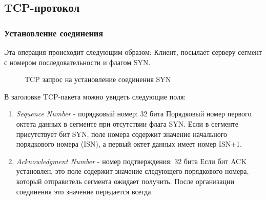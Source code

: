 \documentclass[a4paper, 14pt,russian]{article}
\begin{document}
\newpage

\subsection{TCP-протокол}
	\subsubsection{Установление соединения}
		Эта операция происходит следующим образом: 
		Клиент, посылает серверу сегмент с номером последовательности и флагом SYN.
		\begin{figure}[h!]
			\caption{TCP запрос на установление соединения SYN}
			\label{img:tcp_syn}
		\end{figure}
		
		\newpage
		В заголовке TCP-пакета можно увидеть следующие поля:
		
		\begin{enumerate}
			\item \textit{Sequence Number} - порядковый номер: 32 бита
			Порядковый номер первого октета данных в сегменте при отсутствии флага SYN. Если в сегменте присутствует бит SYN, поле номера содержит значение начального порядкового номера (ISN), а первый октет данных имеет номер ISN+1.
			\item \textit{Acknowledgment Number} - номер подтверждения: 32 бита
			Если бит ACK установлен, это поле содержит значение следующего порядкового номера, который отправитель сегмента ожидает получить. После организации соединения это значение передается всегда.
		\end{enumerate}
	
\end{document}
